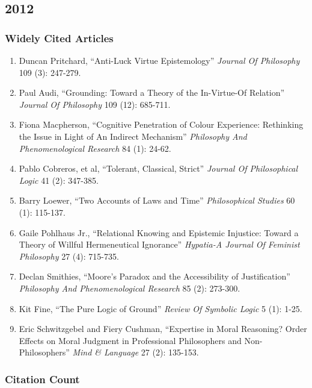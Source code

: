 \documentclass[
  10pt,
  letterpaper,
  DIV=11,
  numbers=noendperiod,
  twoside]{scrartcl}
\providecommand{\tightlist}{%
  \setlength{\itemsep}{0pt}\setlength{\parskip}{0pt}}\usepackage{longtable,booktabs,array}
\begin{document}
\newpage

\subsection{2012}\label{section-36}

\subsubsection*{Widely Cited Articles}\label{widely-cited-articles-36}

\begin{enumerate}
\def\labelenumi{\arabic{enumi}.}
\tightlist
\item
  Duncan Pritchard, ``Anti-Luck Virtue Epistemology'' \emph{Journal Of
  Philosophy} 109 (3): 247-279.
\item
  Paul Audi, ``Grounding: Toward a Theory of the In-Virtue-Of Relation''
  \emph{Journal Of Philosophy} 109 (12): 685-711.
\item
  Fiona Macpherson, ``Cognitive Penetration of Colour Experience:
  Rethinking the Issue in Light of An Indirect Mechanism''
  \emph{Philosophy And Phenomenological Research} 84 (1): 24-62.
\item
  Pablo Cobreros, et al, ``Tolerant, Classical, Strict'' \emph{Journal
  Of Philosophical Logic} 41 (2): 347-385.
\item
  Barry Loewer, ``Two Accounts of Laws and Time'' \emph{Philosophical
  Studies} 60 (1): 115-137.
\item
  Gaile Pohlhaus Jr., ``Relational Knowing and Epistemic Injustice:
  Toward a Theory of Willful Hermeneutical Ignorance'' \emph{Hypatia-A
  Journal Of Feminist Philosophy} 27 (4): 715-735.
\item
  Declan Smithies, ``Moore's Paradox and the Accessibility of
  Justification'' \emph{Philosophy And Phenomenological Research} 85
  (2): 273-300.
\item
  Kit Fine, ``The Pure Logic of Ground'' \emph{Review Of Symbolic Logic}
  5 (1): 1-25.
\item
  Eric Schwitzgebel and Fiery Cushman, ``Expertise in Moral Reasoning?
  Order Effects on Moral Judgment in Professional Philosophers and
  Non-Philosophers'' \emph{Mind \& Language} 27 (2): 135-153.
\end{enumerate}

\subsubsection*{Citation Count}\label{citation-count-36}
\end{document}
